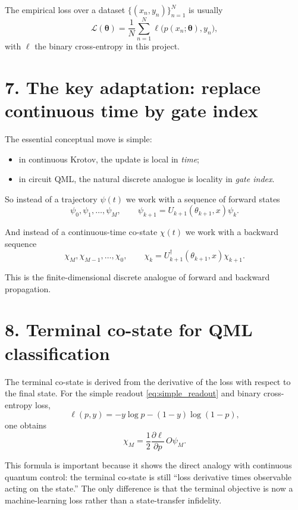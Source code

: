 \documentclass[11pt]{article}
\begin{document}
The empirical loss over a dataset $\{(x_n,y_n)\}_{n=1}^N$ is usually
\begin{equation}
\mathcal{L}(\bm{\theta})
=
\frac{1}{N}\sum_{n=1}^N
\ell\bigl(p(x_n;\bm{\theta}), y_n\bigr),
\end{equation}
with $\ell$ the binary cross-entropy in this project.

\section*{7. The key adaptation: replace continuous time by gate index}
The essential conceptual move is simple:
\begin{itemize}
\item in continuous Krotov, the update is local in \emph{time};
\item in circuit QML, the natural discrete analogue is locality in \emph{gate index}.
\end{itemize}

So instead of a trajectory $\psi(t)$ we work with a sequence of forward states
\begin{equation}
\psi_0,\psi_1,\dots,\psi_M,
\qquad
\psi_{k+1}=U_{k+1}(\theta_{k+1},x)\psi_k.
\end{equation}

And instead of a continuous-time co-state $\chi(t)$ we work with a backward sequence
\begin{equation}
\chi_M,\chi_{M-1},\dots,\chi_0,
\qquad
\chi_k = U_{k+1}^\dagger(\theta_{k+1},x)\chi_{k+1}.
\end{equation}

This is the finite-dimensional discrete analogue of forward and backward propagation.

\section*{8. Terminal co-state for QML classification}
The terminal co-state is derived from the derivative of the loss with respect to the final state. For the simple readout \eqref{eq:simple_readout} and binary cross-entropy loss,
\begin{equation}
\ell(p,y) = -y\log p - (1-y)\log(1-p),
\end{equation}
one obtains
\begin{equation}
\chi_M
=
\frac{1}{2}
\frac{\partial \ell}{\partial p}
\,
O\psi_M.
\label{eq:terminal_costate_qml}
\end{equation}

This formula is important because it shows the direct analogy with continuous quantum control: the terminal co-state is still ``loss derivative times observable acting on the state.'' The only difference is that the terminal objective is now a machine-learning loss rather than a state-transfer infidelity.
\end{document}
